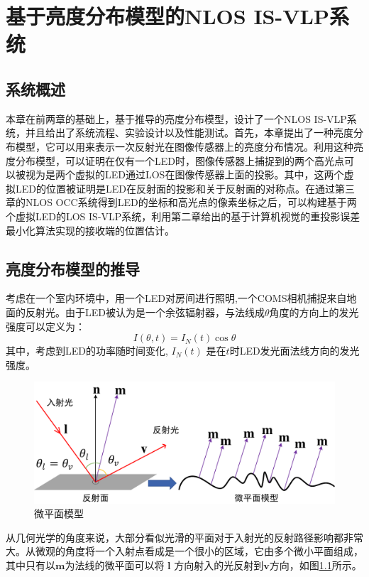 \chapter{基于亮度分布模型的NLOS IS-VLP系统}
\section{系统概述}
本章在前两章的基础上，基于推导的亮度分布模型，设计了一个NLOS IS-VLP系统，并且给出了系统流程、实验设计以及性能测试。首先，本章提出了一种亮度分布模型，它可以用来表示一次反射光在图像传感器上的亮度分布情况。利用这种亮度分布模型，可以证明在仅有一个LED时，图像传感器上捕捉到的两个高光点可以被视为是两个虚拟的LED通过LOS在图像传感器上面的投影。其中，这两个虚拟LED的位置被证明是LED在反射面的投影和关于反射面的对称点。在通过第三章的NLOS OCC系统得到LED的坐标和高光点的像素坐标之后，可以构建基于两个虚拟LED的LOS IS-VLP系统，利用第二章给出的基于计算机视觉的重投影误差最小化算法实现的接收端的位置估计。

\section{亮度分布模型的推导}
考虑在一个室内环境中，用一个LED对房间进行照明,一个COMS相机捕捉来自地面的反射光。由于LED被认为是一个余弦辐射器，与法线成$\theta$角度的方向上的发光强度可以定义为：
\begin{equation}\label{eq:It}
  I(\theta ,t) = I_{N}(t)\cos\theta
\end{equation}
其中，考虑到LED的功率随时间变化, $I_{N}(t)$ 是在$t$时LED发光面法线方向的发光强度。

\begin{figure}[!b]
  \centering
  \includegraphics[width=0.8\linewidth]{FIG/Microfacetmodel.pdf}
  \caption{微平面模型}
  \label{fig:microfacet_model}
\end{figure}
从几何光学的角度来说，大部分看似光滑的平面对于入射光的反射路径影响都非常大。从微观的角度将一个入射点看成是一个很小的区域，它由多个微小平面组成，其中只有以$\mathbf{m}$为法线的微平面可以将 $\mathbf{l}$ 方向射入的光反射到$\mathbf{v}$方向，如图\ref{fig:microfacet_model}所示。

